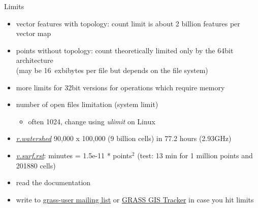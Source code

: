 \documentclass[xcolor={dvipsnames,usenames},beamer,aspectratio=169]{beamer}
\newcommand{\gmodule}[1]{\href{http://grass.osgeo.org/grass71/manuals/#1.html}{\emph{#1}}}
\begin{document}
\begin{frame}{Limits}

\begin{itemize}
  \item vector features with topology:
    count limit is about 2 billion features per vector map
  \item points without topology:
    count theoretically limited only by the 64bit architecture\\
    (may be 16~exbibytes per file but depends on the file system)
  \item more limits for 32bit versions for operations which require memory
  \item number of open files limitation (system limit)
  \begin{itemize}
   \item often 1024, change using \emph{ulimit} on Linux
  \end{itemize}
  \item \gmodule{r.watershed} 90,000 x 100,000 (9 billion cells) in 77.2 hours (2.93GHz)
  \item
    \gmodule{v.surf.rst}: minutes = 1.5e-11 * points$^2$
    {\footnotesize (test: 13 min for 1 million points and 201880 cells)}
  \item read the documentation
  \item write to \href{https://lists.osgeo.org/listinfo/grass-user}{grass-user mailing list}
    or \href{http://trac.osgeo.org/grass/}{GRASS GIS Tracker} in case you hit limits
\end{itemize}

\end{frame}
\end{document}
